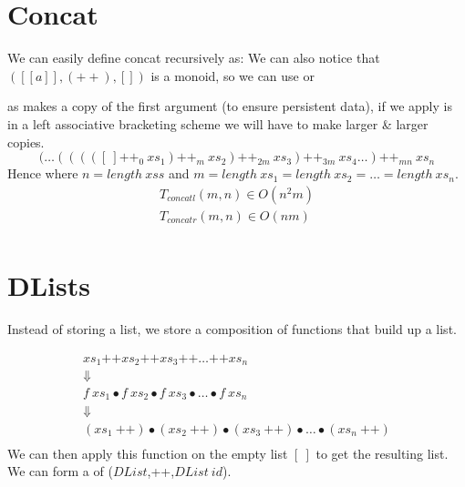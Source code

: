 \documentclass{report}
\begin{document}
    \section*{Concat}
        We can easily define concat recursively as:
        We can also notice that $([[a]], (++), [])$ is a monoid, so we can use  or 
        \\\begin{minipage}[t]{0.45\textwidth}
        \end{minipage}
        \hfill
        \begin{minipage}[t]{0.45\textwidth}
        \end{minipage}
        as \fun{(++)} makes a copy of the first argument (to ensure persistent data), if we apply is in a left associative bracketing scheme we will have to make larger \& larger copies.
        \[( \dots (((( [ \ ] \text{++}_{0} \  xs_1) \text{++}_{m} \ xs_2) \text{++}_{2m} \ xs_3) \text{++}_{3m}  \ xs_4 \dots) \text{++}_{mn} \ xs_n\]
        Hence where $n = length \ xss$ and $m = length \ xs_1 = length \ xs_2 = \dots = length \ xs_n$.
        \[\begin{matrix}
            T_{concatl}(m,n) \in O(n^2m) \\
            T_{concatr}(m,n) \in O(nm) \\
        \end{matrix}\]
    
    \section*{DLists}
        Instead of storing a list, we store a composition of functions that build up a list.

        \[ \begin{matrix}
            xs_1 \text{++} xs_2 \text{++} xs_3 \text{++} \dots \text{++} xs_n \\
            \Downarrow \\
            f \ xs_1 \bullet f \ xs_2 \bullet f \ xs_3 \bullet \dots \bullet f \ xs_n \\
            \Downarrow \\
            (xs_1 \ \text{++}) \bullet (xs_2 \ \text{++}) \bullet (xs_3 \ \text{++}) \bullet \dots \bullet (xs_n \ \text{++}) \\
        \end{matrix}\]
        We can then apply this function on the empty list $[ \ ]$ to get the resulting list.
        We can form a  of ($DList$,++,$DList \ id$).
\end{document}
